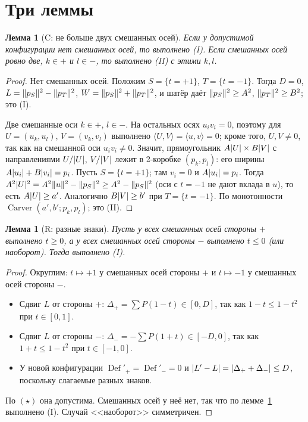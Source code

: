 \documentclass[11pt]{article}
\newtheorem{lemma}[theorem]{Лемма}
\theoremstyle{definition}
\theoremstyle{remark}
\newcommand{\Carver}{\operatorname{Carver}}
\newcommand{\Def}{\operatorname{Def}}
\DeclarePairedDelimiter{\abs}{\lvert}{\rvert}
\DeclarePairedDelimiter{\norm}{\lVert}{\rVert}
\begin{document}
\section{Три леммы}\label{sec:lemmas}

\begin{lemma}[C: не больше двух смешанных осей]\label{lem:C}
Если у допустимой конфигурации нет смешанных осей, то выполнено (I). Если смешанных осей ровно две,
$k\in+$ и $l\in-$, то выполнено (II) с этими $k,l$.
\end{lemma}
\begin{proof}
Нет смешанных осей. Положим $S=\{t=+1\}$, $T=\{t=-1\}$. Тогда $D=0$, $L=\norm{p_S}^2-\norm{p_T}^2$,
$W=\norm{p_S}^2+\norm{p_T}^2$, и шатёр даёт $\norm{p_S}^2\ge A^2$, $\norm{p_T}^2\ge B^2$; это (I).

Две смешанные оси $k\in+$, $l\in-$. На остальных осях $u_iv_i=0$, поэтому для $U=(u_k,u_l)$, $V=(v_k,v_l)$
выполнено $\langle U,V\rangle=\langle u,v\rangle=0$; кроме того, $U,V\ne0$, так как на смешанной оси
$u_iv_i\ne0$. Значит, прямоугольник $A\abs U\times B\abs V$ с направлениями $U/\abs U$, $V/\abs V$ лежит в
2-коробке $(p_k,p_l)$: его ширины $A\abs{u_i}+B\abs{v_i}=p_i$. Пусть $S=\{t=+1\}$; там $v_i=0$ и
$A\abs{u_i}=p_i$. Тогда $A^2\abs U^2=A^2\norm u^2-\norm{p_S}^2\ge A^2-\norm{p_S}^2$ (оси с $t=-1$ не дают
вклада в $u$), то есть $A\abs U\ge a'$. Аналогично $B\abs V\ge b'$ при $T=\{t=-1\}$. По монотонности
$\Carver(a',b';p_k,p_l)$; это (II).
\end{proof}

\begin{lemma}[R: разные знаки]\label{lem:R}
Пусть у всех смешанных осей стороны $+$ выполнено $t\ge0$, а у всех смешанных осей стороны $-$ выполнено
$t\le0$ (или наоборот). Тогда выполнено (I).
\end{lemma}
\begin{proof}
Округлим: $t\mapsto+1$ у смешанных осей стороны $+$ и $t\mapsto-1$ у смешанных осей стороны $-$.
\begin{itemize}
\item Сдвиг $L$ от стороны $+$: $\Delta_+=\sum P(1-t)\in[0,D]$, так как $1-t\le1-t^2$ при $t\in[0,1]$.
\item Сдвиг $L$ от стороны $-$: $\Delta_-=-\sum P(1+t)\in[-D,0]$, так как $1+t\le1-t^2$ при $t\in[-1,0]$.
\item У новой конфигурации $\Def'_+=\Def'_-=0$ и $\abs{L'-L}=\abs{\Delta_++\Delta_-}\le D$, поскольку
слагаемые разных знаков.
\end{itemize}
По $(\star)$ она допустима. Смешанных осей у неё нет, так что по лемме~\ref{lem:C} выполнено (I). Случай
<<наоборот>> симметричен.
\end{proof}
\end{document}
